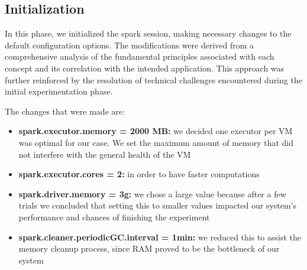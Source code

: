 \documentclass[conference]{IEEEtran}
\begin{document}
\subsection{Initialization}
In this phase, we initialized the spark session, making necessary changes to the default configuration options. The modifications were derived from a comprehensive analysis of the fundamental principles associated with each concept and its correlation with the intended application. This approach was further reinforced by the resolution of technical challenges encountered during the initial experimentation phase.

The changes that were made are:
\begin{itemize}
    \item {\textbf{spark.executor.memory = 2000 MB:} we decided one executor per VM was optimal for our case. We set the maximum amount of memory that did not interfere with the general health of the VM}
    \item \textbf{spark.executor.cores = 2:} in order to have faster computations 
    \item \textbf{spark.driver.memory = 3g:} we chose a large value because after a few trials we concluded that setting this to smaller values impacted our system's performance and chances of finishing the experiment
    \item \textbf{spark.cleaner.periodicGC.interval = 1min:} we reduced this to assist the memory cleanup process, since RAM proved to be the bottleneck of our system
\end{itemize} 
\end{document}
